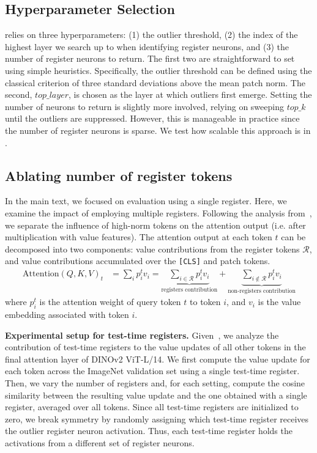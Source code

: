 \documentclass{article}
\begin{document}
\subsection{Hyperparameter Selection}
\label{appendix:hyperparameters}
 relies on three hyperparameters: (1) the outlier threshold, (2) the index of the highest layer we search up to when identifying register neurons, and (3) the number of register neurons to return. The first two are straightforward to set using simple heuristics. Specifically, the outlier threshold can be defined using the classical criterion of three standard deviations above the mean patch norm. The second, $top\_layer$, is chosen as the layer at which outliers first emerge. Setting the number of neurons to return is slightly more involved, relying on sweeping $top\_k$ until the outliers are suppressed. However, this is manageable in practice since the number of register neurons is sparse. We test how scalable this approach is in .


\subsection{Ablating number of register tokens}
\label{appendix:different_register tokens}
In the main text, we focused on evaluation using a single register. Here, we examine the impact of employing multiple registers. Following the analysis from~\cite{sunmassive}, we separate the influence of high-norm tokens on the attention output (i.e. after multiplication with value features). The attention output at each token $t$ can be decomposed into two components: value contributions from the register tokens $\mathcal{R}$, and value contributions accumulated over the \texttt{[CLS]} and patch tokens.
\begin{align}
\text{Attention}(Q, K, V)_{t} 
&= \sum_{i} p^{t}_{i} v_{i} =\underbrace{\sum_{i \in \mathcal{R}} p^{t}_{i} v_{i}}_{\text{registers contribution}} 
+ \underbrace{\sum_{i \notin \mathcal{R}} p^{t}_{i} v_{i}}_{\text{non-registers contribution}} \label{eq:attn-decomp}
\end{align}
where $p^{t}_{i}$ is the attention weight of query token $t$ to token $i$, and $v_{i}$ is the value embedding associated with token $i$. 

\textbf{Experimental setup for test-time registers.} Given~, we analyze the contribution of test-time registers to the value updates of all other tokens in the final attention layer of DINOv2 ViT-L/14. We first compute the value update for each token across the ImageNet validation set using a single test-time register. Then, we vary the number of registers and, for each setting, compute the cosine similarity between the resulting value update and the one obtained with a single register, averaged over all tokens. Since all test-time registers are initialized to zero, we break symmetry by randomly assigning which test-time register receives the outlier register neuron activation. Thus, each test-time register holds the activations from a different set of register neurons.
\end{document}

